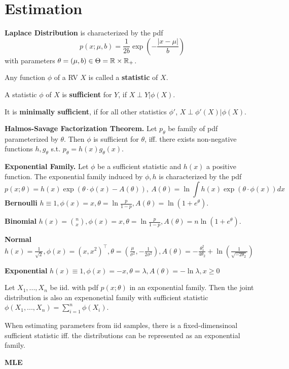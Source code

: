 \section{Estimation}
\textbf{Laplace Distribution} is characterized by the pdf
\[p(x; \mu, b) = \frac{1}{2b}\exp\left(-\frac{|x-\mu|}{b}\right)\]
with parameters \(\theta = (\mu, b) \in \Theta = \mathbb{R} \times \mathbb{R}_+\).

Any function \(\phi\) of a RV \(X\) is called a \textbf{statistic} of \(X\).

A statistic \(\phi\) of \(X\) is \textbf{sufficient} for \(Y\), if \(X \perp Y | \phi(X)\).

It is \textbf{minimally sufficient}, if for all other statistics \(\phi'\), \(X \perp \phi'(X) | \phi(X)\).

\textbf{Halmos-Savage Factorization Theorem.} Let \(p_\theta\) be family of pdf parameterized by \(\theta\). 
Then \(\phi\) is sufficient for \(\theta\), iff. there exists non-negative functions \(h, g_\theta\) s.t.
\(p_\theta = h(x)g_\theta(x)\).

\textbf{Exponential Family.} Let \(\phi\) be a sufficient statistic and \(h(x)\) a positive function. 
The exponential family induced by \(\phi, h\) is characterized by the pdf
\[p(x; \theta) = h(x)\exp(\theta\cdot\phi(x)-A(\theta)), \ A(\theta) = \ln \int h(x) \exp(\theta \cdot \phi(x))dx\]
\textbf{Bernoulli} \(h \equiv 1, \phi(x) = x, \theta = \ln \frac{p}{1-p}, A(\theta) = \ln(1+e^\theta)\).

\textbf{Binomial} \(h(x) = \binom{n}{x}, \phi(x) = x, \theta =  \ln \frac{p}{1-p}, A(\theta) = n \ln(1+e^\theta)\).

\textbf{Normal} \(h(x) = \frac{1}{\sqrt{2}}, \phi(x) = (x, x^2)^\top, \theta = \left(\frac{\mu}{\sigma^2}, -\frac{1}{2\sigma^2}\right), 
A(\theta) = -\frac{\theta_1^2}{4\theta_2} + \ln\left(\frac{1}{\sqrt{-2\theta_2}}\right)\)  


\textbf{Exponential} \(h(x) \equiv 1, \phi(x) = -x, \theta = \lambda, A(\theta) = - \ln \lambda, x \geq 0\)

Let \(X_1, ..., X_n\) be iid. with pdf \(p(x; \theta)\) in an exponential family. 
Then the joint distribution is also an expenonetial family 
with sufficient statistic \(\phi(X_1, ..., X_n) = \sum_{i = 1}^n \phi(X_i)\).

When estimating parameters from iid samples, there is a fixed-dimensinoal sufficient statistic 
iff. the distributions can be represented as an exponential family.

\textbf{MLE}

